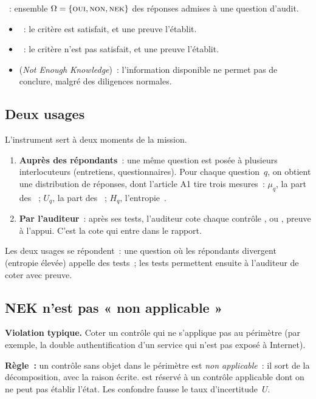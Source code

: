 \begin{boxdef}
~: ensemble $\Omega = \{\textsc{oui}, \textsc{non}, \textsc{nek}\}$ des réponses
admises à une question d'audit.
\begin{itemize}
    \item \OUI{}~: le critère est satisfait, et une preuve l'établit.
    \item \NON{}~: le critère n'est pas satisfait, et une preuve l'établit.
    \item \NEK{} (\textit{Not Enough Knowledge})~: l'information disponible
          ne permet pas de conclure, malgré des diligences normales.
\end{itemize}
\end{boxdef}

\subsection{Deux usages}

L'instrument sert à deux moments de la mission.
\begin{enumerate}
    \item \textbf{Auprès des répondants}~: une même question est posée à
          plusieurs interlocuteurs (entretiens, questionnaires). Pour chaque
          question~$q$, on obtient une distribution de réponses, dont l'article
          A1 tire trois mesures~: $\mu_q$, la part des \OUI{}~; $U_q$, la part
          des \NEK{}~; $H_q$, l'entropie~\cite{minka2026nek}.
    \item \textbf{Par l'auditeur}~: après ses tests, l'auditeur cote chaque
          contrôle \OUI{}, \NON{} ou \NEK{}, preuve à l'appui. C'est la cote
          qui entre dans le rapport.
\end{enumerate}
Les deux usages se répondent~: une question où les répondants divergent
(entropie élevée) appelle des tests~; les tests permettent ensuite à
l'auditeur de coter avec preuve.

\subsection{NEK n'est pas « non applicable »}

\begin{boxalert}
\textbf{Violation typique.} Coter \NEK{} un contrôle qui ne s'applique pas au
périmètre (par exemple, la double authentification d'un service qui n'est
pas exposé à Internet).

\smallskip
\textbf{Règle~:} un contrôle sans objet dans le périmètre est \emph{non
applicable}~: il sort de la décomposition, avec la raison écrite. \NEK{} est
réservé à un contrôle applicable dont on ne peut pas établir l'état. Les
confondre fausse le taux d'incertitude~$U$.
\end{boxalert}

